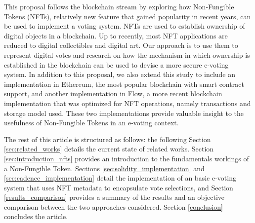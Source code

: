 \documentclass[../access.tex]{subfiles}
\begin{document}
\par
This proposal follows the blockchain stream by exploring how Non-Fungible Tokens (NFTs), relatively new feature that gained popularity in recent years, can be used to implement a voting system. NFTs are used to establish ownership of digital objects in a blockchain. Up to recently, most NFT applications are reduced to digital collectibles and digital art. Our approach is to use them to represent digital votes and research on how the mechanism in which ownership is established in the blockchain can be used to devise a more secure e-voting system. In addition to this proposal, we also extend this study to include an implementation in Ethereum, the most popular blockchain with smart contract support, and another implementation in Flow, a more recent blockchain implementation that was optimized for NFT operations, namely transactions and storage model used. These two implementations provide valuable insight to the usefulness of Non-Fungible Tokens in an e-voting context.
\par
The rest of this article is structured as follows: the following Section \ref{sec:related_works} details the current state of related works. Section \ref{sec:introduction_nfts} provides an introduction to the fundamentals workings of a Non-Fungible Token. Sections \ref{sec:solidity_implementation} and \ref{sec:cadence_implementation} detail the implementation of an basic e-voting system that uses NFT metadata to encapsulate vote selections, and Section \ref{results_comparison} provides a summary of the results and an objective comparison between the two approaches considered. Section \ref{conclusion} concludes the article.
\end{document}
